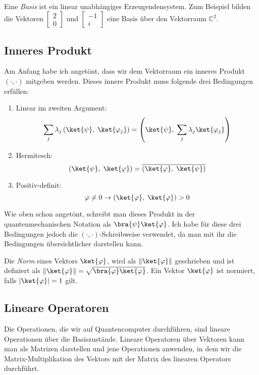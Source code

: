 \paragraph{}
Eine \textit{Basis} ist ein linear unabhängiges Erzeugendensystem.
Zum Beispiel bilden die Vektoren $\begin{bmatrix}2 \\ 0\end{bmatrix}$ und $\begin{bmatrix}-1 \\ i\end{bmatrix}$ eine Basis über den Vektorraum $\mathbb{C}^2$.

\subsection{Inneres Produkt}
Am Anfang habe ich angetönt, dass wir dem Vektorraum ein inneres Produkt $(\cdot,\cdot)$ mitgeben werden. Dieses innere Produkt muss folgende drei Bedingungen erfüllen: 
\begin{enumerate}
    \item Linear im zweiten Argument: $$\sum_j\lambda_j\left(\ket{\psi}, \; \ket{\varphi_j}\right) = \left(\ket{\psi}, \; \sum_j\lambda_j\ket{\varphi_j}\right)$$
    \item Hermitesch: $$\left(\ket{\psi}, \; \ket{\varphi} \right) = \overline{\left(\ket{\varphi} , \; \ket{\psi}\right)}$$
    \item Positiv-definit: $$\varphi \neq 0 \rightarrow \left( \ket{\varphi}, \; \ket{\varphi} \right) > 0$$
\end{enumerate}
Wie oben schon angetönt, schreibt man dieses Produkt in der quantenmechanischen Notation als $\bra{\psi}\ket{\varphi}$. Ich habe für diese drei Bedingungen jedoch die $(\cdot, \cdot)$-Schreibweise verwendet, da man mit ihr die Bedingungen übersichtlicher darstellen kann.

Die \textit{Norm} eines Vektors $\ket{\varphi}$, wird als $\left\| \ket{\varphi} \right\|$ geschrieben und ist definiert als $\left\| \ket{\varphi} \right\| = \sqrt{\bra{\varphi}\ket{\varphi}}$. Ein Vektor $\ket{\varphi}$ ist normiert, falls $\left| \ket{\varphi} \right| = 1$ gilt.

\subsection{Lineare Operatoren}
Die Operationen, die wir auf Quantencomputer durchführen, sind lineare Operationen über die Basiszustände. Lineare Operatoren über Vektoren kann man als Matrizen darstellen und jene Operationen anwenden, in dem wir die Matrix-Multiplikation des Vektors mit der Matrix des linearen Operators durchführt.

